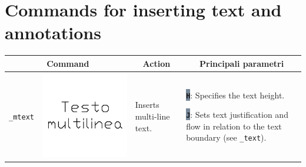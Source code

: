 \documentclass[..]{../IEEEphot}
\newcommand{\param}[1]{\colorbox{LightSlateGray}{\color{Navy}\texttt{\textbf{#1}}}}
\begin{document}
\clearpage

\section{Commands for inserting text and annotations}

\begin{center}
\begin{longtable}{m{.2\linewidth}m{.2\linewidth}m{.25\linewidth}m{.25\linewidth}}
\toprule
    \multicolumn{2}{c}{\bfseries Command} &
    \multicolumn{1}{c}{\bfseries Action} &
    \multicolumn{1}{c}{\bfseries Principali parametri} \\
\midrule
\texttt{\_mtext} & \includegraphics[width = 0.8\linewidth, keepaspectratio]{../images/jpg/_mtext.jpg} & Inserts multi-line text. & 
\param{H}: Specifies the text height.

\param{J}: Sets text justification and flow in relation to the text boundary (see \texttt{\_text}).


\end{longtable}
\end{center}
\end{document}
